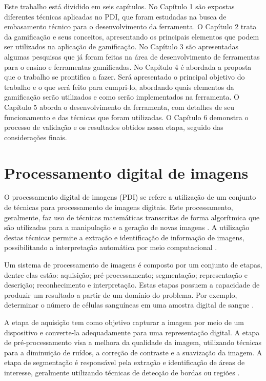 \documentclass[
	12pt,				%
	oneside,			%
	a4paper,			%
	english,			%
	french,				%
	spanish,			%
	brazil,				%
	]{abntex2}
\begin{document}
Este trabalho está dividido em seis capítulos. No Capítulo 1 são expostas diferentes técnicas aplicadas no PDI, que foram estudadas na busca de embasamento técnico para o desenvolvimento da ferramenta. O Capítulo 2 trata da gamificação e seus conceitos, apresentando os principais elementos que podem ser utilizados na aplicação de gamificação. No Capítulo 3 são apresentadas algumas pesquisas que já foram feitas na área de desenvolvimento de ferramentas para o ensino e ferramentas gamificadas. No Capítulo 4 é abordada a proposta que o trabalho se prontifica a fazer. Será apresentado o principal objetivo do trabalho e o que será feito para cumpri-lo, abordando quais elementos da gamificação serão utilizados e como serão implementados na ferramenta. O Capítulo 5 aborda o desenvolvimento da ferramenta, com detalhes de seu funcionamento e das técnicas que foram utilizadas. O Capítulo 6 demonstra o processo de validação e os resultados obtidos nessa etapa, seguido das considerações finais.

\chapter{Processamento digital de imagens}
\label{sec:pdi}

O  processamento digital de imagens (PDI) se refere a utilização de um conjunto de técnicas para processamento de imagens digitais. Este processamento, geralmente, faz uso de técnicas matemáticas transcritas de forma algorítmica que são utilizadas para a manipulação e a geração de novas imagens \cite{gonzalesWoods:2008}. A utilização destas técnicas permite a extração e identificação de informação de imagens, possibilitando a interpretação automática por meio computacional \cite{pedriniSchwartz:2008}.

Um sistema de processamento de imagens é composto por um conjunto de etapas, dentre elas estão: aquisição; pré-processamento; segmentação; representação e descrição; reconhecimento e interpretação. Estas etapas possuem a capacidade de produzir um resultado a partir de um domínio do problema. Por exemplo, determinar o número de células sanguíneas em uma amostra digital de sangue \cite{pedriniSchwartz:2008}.

A etapa de aquisição tem como objetivo capturar a imagem por meio de um dispositivo e converte-la adequadamente para uma representação digital. A etapa de pré-processamento visa a melhora da qualidade da imagem, utilizando técnicas para a diminuição de ruídos, a correção de contraste e a suavização da imagem. A etapa de segmentação é responsável pela extração e identificação de áreas de interesse, geralmente utilizando técnicas de detecção de bordas ou regiões \cite{pedriniSchwartz:2008}.
\end{document}
